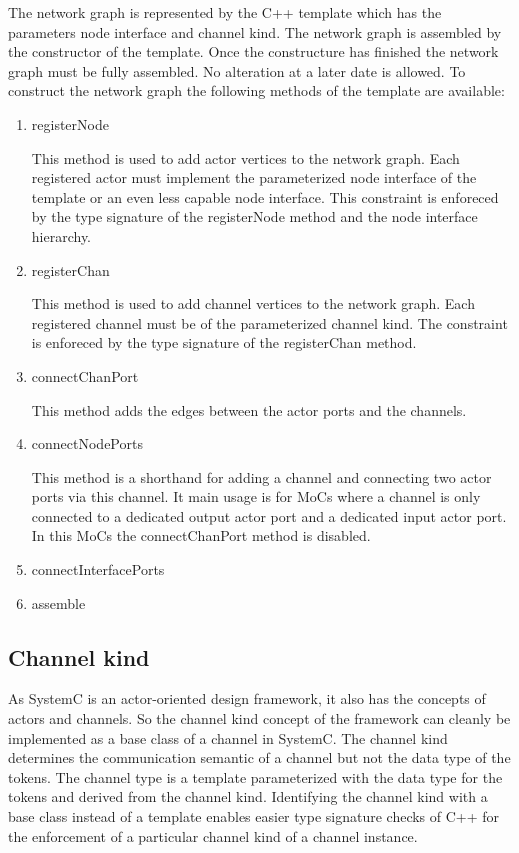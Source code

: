 The network graph is represented by the C++ template
 which has the parameters node interface
and channel kind. The network graph is assembled by the
constructor of the   template.
Once the constructure has finished the network graph must
be fully assembled. No alteration at a later date is allowed.
To construct the network graph the following methods of the
 template are available:

\begin{enumerate}
\item registerNode

This method is used to add actor vertices to the network graph.
Each registered actor must implement
the parameterized node interface of the 
template or an even less capable node interface.
This constraint is enforeced by the type signature
of the registerNode method and the node interface hierarchy.

\item registerChan

This method is used to add channel vertices to the network graph.
Each registered channel must be of the parameterized channel kind.
The constraint is enforeced by the type signature
of the registerChan method.

\item connectChanPort

This method adds the edges between the actor ports and the
channels.

\item connectNodePorts

This method is a shorthand for adding a channel and
connecting two actor ports via this channel. It main usage
is for MoCs where a channel is only connected to a dedicated
output actor port and a dedicated input actor port. In
this MoCs the connectChanPort method is disabled.

\item connectInterfacePorts

\item assemble

\end{enumerate}




\subsection{Channel kind}

As SystemC is an actor-oriented design framework, it also has the concepts of actors
and channels. So the channel kind concept of the \SysteMoC{} framework can cleanly be implemented
as a base class of a channel in SystemC. The channel kind determines the
communication semantic of a channel but not the data type of the tokens.
The channel type is a template parameterized with the data type for the tokens and
derived from the channel kind. Identifying the channel kind with a base class instead
of a template enables easier type signature checks of C++ for the enforcement of a
particular channel kind of a channel instance.

